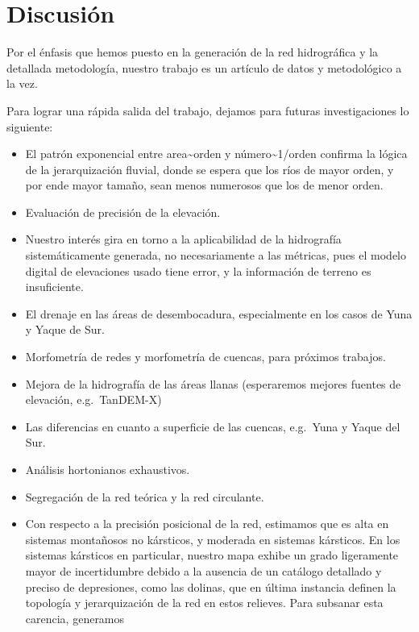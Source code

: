 \documentclass[spanish]{article}
\providecommand{\tightlist}{%
  \setlength{\itemsep}{0pt}\setlength{\parskip}{0pt}}
\begin{document}
\hypertarget{discusiuxf3n}{%
\section{Discusión}\label{discusiuxf3n}}

Por el énfasis que hemos puesto en la generación de la red hidrográfica
y la detallada metodología, nuestro trabajo es un artículo de datos y
metodológico a la vez.

Para lograr una rápida salida del trabajo, dejamos para futuras
investigaciones lo siguiente:

\begin{itemize}
\tightlist
\item
  El patrón exponencial entre area\textasciitilde orden y
  número\textasciitilde1/orden confirma la lógica de la jerarquización
  fluvial, donde se espera que los ríos de mayor orden, y por ende mayor
  tamaño, sean menos numerosos que los de menor orden.
\item
  Evaluación de precisión de la elevación.
\item
  Nuestro interés gira en torno a la aplicabilidad de la hidrografía
  sistemáticamente generada, no necesariamente a las métricas, pues el
  modelo digital de elevaciones usado tiene error, y la información de
  terreno es insuficiente.
\item
  El drenaje en las áreas de desembocadura, especialmente en los casos
  de Yuna y Yaque de Sur.
\item
  Morfometría de redes y morfometría de cuencas, para próximos trabajos.
\item
  Mejora de la hidrografía de las áreas llanas (esperaremos mejores
  fuentes de elevación, e.g.~TanDEM-X)
\item
  Las diferencias en cuanto a superficie de las cuencas, e.g.~Yuna y
  Yaque del Sur.
\item
  Análisis hortonianos exhaustivos.
\item
  Segregación de la red teórica y la red circulante.
\item
  Con respecto a la precisión posicional de la red, estimamos que es
  alta en sistemas montañosos no kársticos, y moderada en sistemas
  kársticos. En los sistemas kársticos en particular, nuestro mapa
  exhibe un grado ligeramente mayor de incertidumbre debido a la
  ausencia de un catálogo detallado y preciso de depresiones, como las
  dolinas, que en última instancia definen la topología y jerarquización
  de la red en estos relieves. Para subsanar esta carencia, generamos

\end{itemize}
\end{document}
